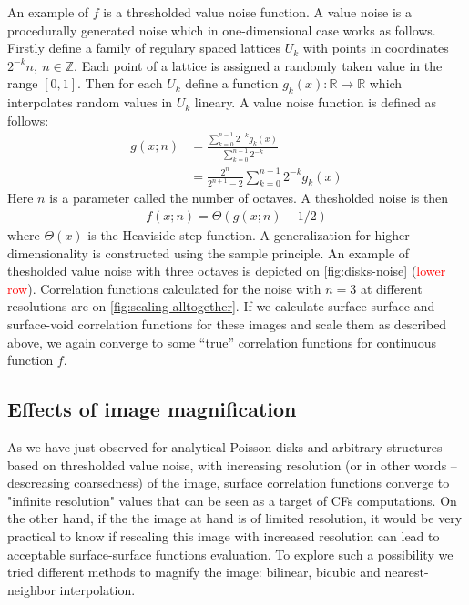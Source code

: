 \documentclass[reprint,amsmath,amssymb,aps,pre,showkeys,showpacs]{revtex4-1}
\begin{document}
An example of $f$ is a thresholded value noise function. A value noise is a
procedurally generated noise which in one-dimensional case works as
follows. Firstly define a family of regulary spaced lattices $U_k$ with points
in coordinates $2^{-k}n,\ n \in \mathbb{Z}$. Each point of a lattice is assigned
a randomly taken value in the range $[0, 1]$. Then for each $U_k$ define a
function $g_k(x): \mathbb{R} \rightarrow \mathbb{R}$ which interpolates random
values in $U_k$ lineary. A value noise function is defined as follows:
\begin{align*}
  g(x; n) &= \frac{\sum\limits_{k=0}^{n-1} 2^{-k}g_k(x)}{\sum\limits_{k=0}^{n-1}
    2^{-k}} \\
  &= \frac{2^n}{2^{n+1}-2} \sum\limits_{k=0}^{n-1} 2^{-k}g_k(x)
\end{align*}
Here $n$ is a parameter called the number of octaves. A thesholded noise is then
\begin{align*}
  f(x; n) = \Theta(g(x; n) - 1/2)
\end{align*}
where $\Theta(x)$ is the Heaviside step function. A generalization for higher
dimensionality is constructed using the sample principle. An example of
thesholded value noise with three octaves is depicted on
\cref{fig:disks-noise} (\textcolor{red}{lower row}). Correlation functions
calculated for the noise with $n = 3$ at different resolutions are on
\cref{fig:scaling-alltogether}. If we calculate surface-surface and surface-void
correlation functions for these images and scale them as described above, we
again converge to some ``true'' correlation functions for continuous function
$f$.

\subsection{Effects of image magnification}
As we have just observed for analytical Poisson disks and arbitrary structures
based on thresholded value noise, with increasing resolution (or in other words
-- descreasing coarsedness) of the image, surface correlation functions converge
to "infinite resolution" values that can be seen as a target of CFs
computations. On the other hand, if the the image at hand is of limited
resolution, it would be very practical to know if rescaling this image with
increased resolution can lead to acceptable surface-surface functions
evaluation. To explore such a possibility we tried different methods to magnify
the image: bilinear, bicubic and nearest-neighbor interpolation.
\end{document}
